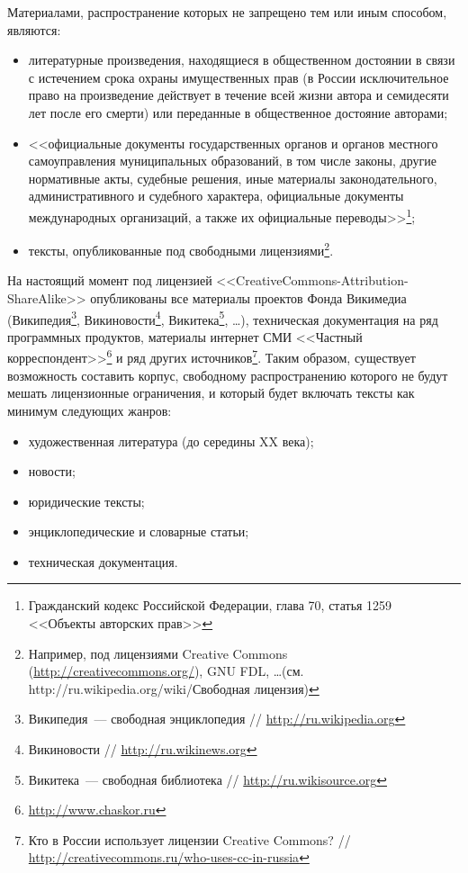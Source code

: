 \documentclass[a4paper]{article}
\begin{document}
Материалами, распространение которых не запрещено тем или иным способом, являются:
\begin{itemize}
\item литературные произведения, находящиеся в общественном достоянии в связи с истечением срока охраны имущественных прав (в России исключительное право на произведение действует в течение всей жизни автора и семидесяти лет после его смерти) или переданные в общественное достояние авторами;
\item <<официальные документы государственных органов и органов местного самоуправления муниципальных образований, в том числе законы, другие нормативные акты, судебные решения, иные материалы законодательного, административного и судебного характера, официальные документы международных организаций, а также их официальные переводы>>\footnote{Гражданский кодекс Российской Федерации, глава 70, статья 1259 <<Объекты авторских прав>>};
\item тексты, опубликованные под свободными лицензиями\footnote{Например, под лицензиями Creative Commons (\url{http://creativecommons.org/}), GNU FDL, \ldots (см. http://ru.wikipedia.org/wiki/Свободная лицензия)}.
\end{itemize}

На настоящий момент под лицензией <<CreativeCommons-Attribution-ShareAlike>> опубликованы все материалы проектов Фонда Викимедиа (Википедия\footnote{Википедия~--- свободная энциклопедия // \url{http://ru.wikipedia.org}}, Викиновости\footnote{Викиновости // \url{http://ru.wikinews.org}}, Викитека\footnote{Викитека~--- свободная библиотека // \url{http://ru.wikisource.org}}, \ldots), техническая документация на ряд программных продуктов, материалы интернет СМИ <<Частный корреспондент>>\footnote{\url{http://www.chaskor.ru}} и ряд других источников\footnote{Кто в России использует лицензии Creative Commons? // \url{http://creativecommons.ru/who-uses-cc-in-russia}}. Таким образом, существует возможность составить корпус, свободному распространению которого не будут мешать лицензионные ограничения, и который будет включать тексты как минимум следующих жанров:
\begin{itemize}
\item художественная литература (до середины XX века);
\item новости;
\item юридические тексты;
\item энциклопедические и словарные статьи;
\item техническая документация.
\end{itemize}
\end{document}
